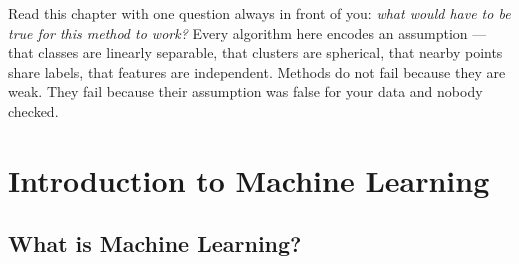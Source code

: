 \begin{engineernote}
Read this chapter with one question always in front of you: \emph{what would
have to be true for this method to work?} Every algorithm here encodes an
assumption --- that classes are linearly separable, that clusters are
spherical, that nearby points share labels, that features are independent.
Methods do not fail because they are weak. They fail because their assumption
was false for your data and nobody checked.
\end{engineernote}

\section{Introduction to Machine Learning}

\subsection{What is Machine Learning?}

